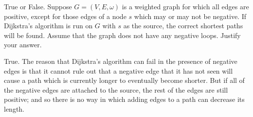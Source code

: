 \begin{prob}
    True or False. Suppose $G = (V, E, \omega)$ is a weighted graph for which
    all edges are positive, except for those edges of a node $s$ which may or
    may not be negative. If Dijkstra's algorithm is run on $G$ with $s$ as
    the source, the correct shortest paths will be found. Assume that the graph does not have any negative loops. Justify your answer.

    \begin{soln}
            True.
            The reason that Dijkstra's algorithm can fail in the presence of
            negative edges is that it cannot rule out that a negative edge that
            it has not seen will cause a path which is currently longer to
            eventually become shorter. But if all of the negative edges are
            attached to the source, the rest of the edges are still positive;
            and so there is no way in which adding edges to a path can decrease
            its length.
    \end{soln}
\end{prob}
